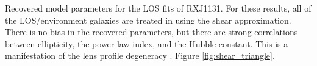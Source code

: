 \label{fig:los_triangle} Recovered model parameters for the LOS fits of RXJ1131. For these results, all of the LOS/environment galaxies are treated in using the shear approximation. There is no bias in the recovered parameters, but there are strong correlations between ellipticity, the power law index, and the Hubble constant. This is a manifestation of the lens profile degeneracy \citep{Kochanek2002}. Figure \ref{fig:shear_triangle}.